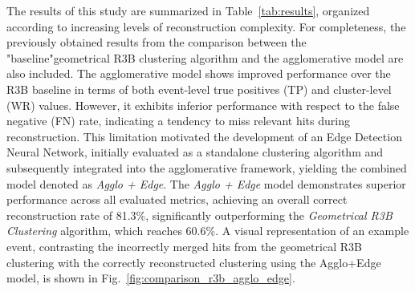 \documentclass[review,sort&compress]{elsarticle}
\begin{document}
The results of this study are summarized in Table~\ref{tab:results}, organized according to increasing levels of reconstruction complexity. For completeness, the previously obtained results from the comparison between the "baseline"geometrical R3B clustering algorithm and the agglomerative model are also included.\newline
The agglomerative model shows improved performance over the R3B baseline in terms of both event-level true positives (TP) and cluster-level (WR) values. However, it exhibits inferior performance with respect to the false negative (FN) rate, indicating a tendency to miss relevant hits during reconstruction. This limitation motivated the development of an Edge Detection Neural Network, initially evaluated as a standalone clustering algorithm and subsequently integrated into the agglomerative framework, yielding the combined model denoted as \textit{Agglo + Edge}.\newline
The \textit{Agglo + Edge} model demonstrates superior performance across all evaluated metrics, achieving an overall correct reconstruction rate of 81.3\%, significantly outperforming the \textit{Geometrical R3B Clustering} algorithm, which reaches 60.6\%.\newline
A visual representation of an example event, contrasting the incorrectly merged hits from the geometrical R3B clustering with the correctly reconstructed clustering using the Agglo+Edge model, is shown in Fig.~\ref{fig:comparison_r3b_agglo_edge}.\newline
\end{document}

